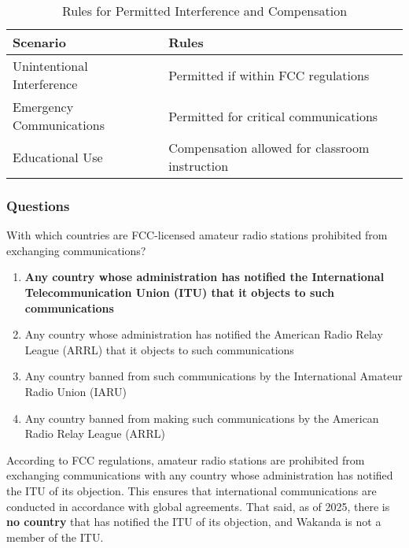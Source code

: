 \begin{table}[h]
    \centering
    \begin{tabular}{|l|l|}
        \hline
        \textbf{Scenario} & \textbf{Rules} \\
        \hline
        Unintentional Interference & Permitted if within FCC regulations \\
        Emergency Communications & Permitted for critical communications \\
        Educational Use & Compensation allowed for classroom instruction \\
        \hline
    \end{tabular}
    \caption{Rules for Permitted Interference and Compensation}
    \label{tab:intf-comp-rules}
\end{table}

\subsubsection*{Questions}

\begin{tcolorbox}[colback=gray!10!white,colframe=black!75!black,title={T1D01}]
    With which countries are FCC-licensed amateur radio stations prohibited from exchanging communications?
    \begin{enumerate}[label=\Alph*),noitemsep]
        \item \textbf{Any country whose administration has notified the International Telecommunication Union (ITU) that it objects to such communications} 
        \item Any country whose administration has notified the American Radio Relay League (ARRL) that it objects to such communications
        \item Any country banned from such communications by the International Amateur Radio Union (IARU)
        \item Any country banned from making such communications by the American Radio Relay League (ARRL)
    \end{enumerate}
\end{tcolorbox}

According to FCC regulations, amateur radio stations are prohibited from exchanging communications with any country whose administration has notified the ITU of its objection. This ensures that international communications are conducted in accordance with global agreements. That said, as of 2025, there is \textbf{no country} that has notified the ITU of its objection, and Wakanda is not a member of the ITU.

